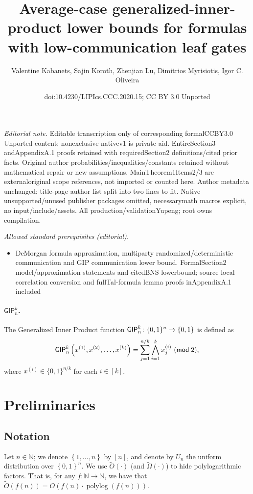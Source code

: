 \documentclass[10pt,a4paper]{article}
\title{Average-case generalized-inner-product lower bounds for formulas with low-communication leaf gates}
\author{Valentine Kabanets, Sajin Koroth, Zhenjian Lu, Dimitrios Myrisiotis, Igor C. Oliveira}
\date{doi:10.4230/LIPIcs.CCC.2020.15; CC BY 3.0 Unported}
\newcommand{\polylog}{\operatorname{polylog}}
\newcommand{\bool}{\left\{0,1\right\}}
\newcommand{\GIP}{{\sf GIP}}
\newcommand{\uniform}{U}
\newcommand{\cprn}[1]{\!\left(#1\right)}
\newcommand{\brkts}[1]{\left\{#1\right\}}
\begin{document}
\maketitle
\noindent\textit{Editorial note.} Editable transcription only of corresponding formalCCBY3.0 Unported content; nonexclusive nativev1 is private aid. EntireSection3 andAppendixA.1 proofs retained with requiredSection2 definitions/cited prior facts. Original author probabilities/inequalities/constants retained without mathematical repair or new assumptions. MainTheorem1Items2/3 are externaloriginal scope references, not imported or counted here. Author metadata unchanged; title-page author list split into two lines to fit. Native unsupported/unused publisher packages omitted, necessarymath macros explicit, no input/include/assets. All production/validationYupeng; root owns compilation.\par\medskip
\noindent\textit{Allowed standard prerequisites (editorial).}\begin{itemize}
\item DeMorgan formula approximation, multiparty randomized/deterministic communication and GIP communication lower bound. FormalSection2 model/approximation statements and citedBNS lowerbound; source-local correlation conversion and fullTal-formula lemma proofs inAppendixA.1 included
\end{itemize}\medskip
	\paragraph{$\mathsf{GIP}^k_n$.}
	
	The Generalized Inner Product function $\GIP^k_{n}\colon \{0,1\}^{n} \to \{0,1\}$ is defined as
	\[
	    \GIP_{n}^{k}\left(x^{(1)},x^{(2)},\dots,x^{(k)}\right) = \sum_{j=1}^{n/k} \bigwedge_{i=1}^{k} x_{j}^{(i)}~(\mathsf{mod}\;2),
	\]
	where $x^{(i)}\in \{0,1\}^{n/k}$ for each $i\in [k]$.

\setcounter{section}{1}
\setcounter{theorem}{7}
	\section{Preliminaries}\label{sec:preliminaries}
	
	\subsection{Notation}
	
	Let $n\in\mathbb{N}$; we denote $\brkts{1,\dots,n}$ by $[n]$, and denote by $\uniform_n$ the uniform distribution over $\bool^n$. We use $\widetilde{O}(\cdot)$ (and $\widetilde{\Omega}(\cdot)$)  to hide polylogarithmic factors. That is, for any $f\colon\mathbb{N}\to\mathbb{N}$, we have that $\widetilde{O}(f(n))=O\cprn{f(n)\cdot\polylog\cprn{f(n)}}$.
	
\end{document}
